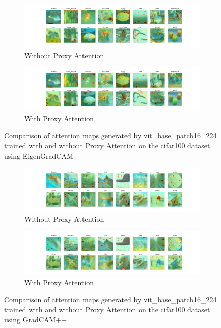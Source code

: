 \documentclass[a4paper,11pt,openright]{book}
\begin{document}
\begin{figure}[!htb]
    \centering
    \begin{subfigure}[b]{1\textwidth}
        \includegraphics[width=\textwidth]{images/gpp_cifar100_vit_base_patch16_224_noproxy_3.pdf}
        \caption{Without Proxy Attention}
    \end{subfigure}
    \hfill
    \begin{subfigure}[b]{1\textwidth}
        \includegraphics[width=\textwidth]{images/gpp_cifar100_vit_base_patch16_224_proxy_3.pdf}
        \caption{With Proxy Attention}
    \end{subfigure}
    \caption{Comparison of attention maps generated by vit\_base\_patch16\_224 trained with and without Proxy Attention on the cifar100 dataset using EigenGradCAM}
\end{figure}



\begin{figure}[!htb]
    \centering
    \begin{subfigure}[b]{1\textwidth}
        \includegraphics[width=\textwidth]{images/cifar100_vit_base_patch16_224_noproxy_1.pdf}
        \caption{Without Proxy Attention}
    \end{subfigure}
    \hfill
    \begin{subfigure}[b]{1\textwidth}
        \includegraphics[width=\textwidth]{images/cifar100_vit_base_patch16_224_proxy_1.pdf}
        \caption{With Proxy Attention}
    \end{subfigure}
    \caption{Comparison of attention maps generated by vit\_base\_patch16\_224 trained with and without Proxy Attention on the cifar100 dataset using GradCAM++}
\end{figure}
\end{document}

